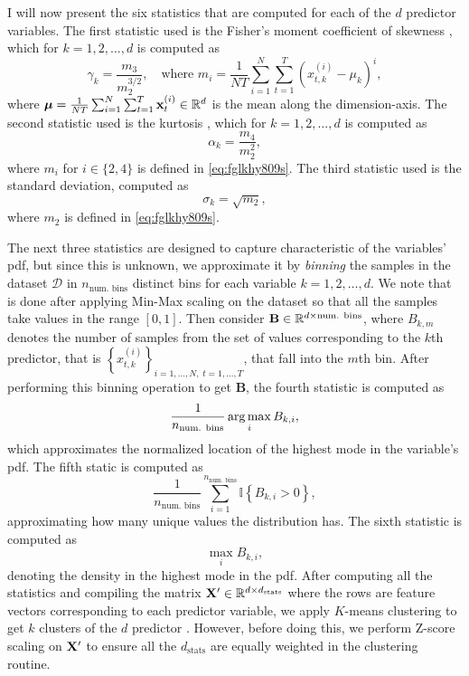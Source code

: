 \documentclass{statsmsc}
\begin{document}
{I will now present the six statistics that are computed
for each of the $d$ predictor variables.
The first statistic used is the Fisher's moment
coefficient of skewness \citep{shape}, which for $k=1,2,\dots,d$ is computed as
\begin{equation}\label{eq:fglkhy809s}
    \gamma_k=\frac{m_3}{m_2^{3/2}}, \quad \textrm{where }
    m_i=  \frac{1}{NT} \sum^{N}_{i=1} \sum^{T}_{t=1} \left(x^{(i)}_{t,k}-\mu_k \right)^i,
\end{equation}
where $\bm{\mu}=\frac{1}{NT}\sum^{N}_{i=1} \sum^{T}_{t=1} \mathbf{x}^{(i)}_t \in \mathbb{R}^d$ is the mean along the dimension-axis. 
The second statistic used is the kurtosis \citep{shape}, which for $k=1,2,\dots,d$ is computed as
\begin{equation}
    \alpha_k=\frac{m_4}{m_2^2},
\end{equation}
where $m_i$ for $i\in \{2,4\}$ is defined in  \cref{eq:fglkhy809s}.
The third statistic used is the standard deviation, computed as
\begin{equation}
    \sigma_k=\sqrt{m_2},
\end{equation}
where $m_2$ is defined in \cref{eq:fglkhy809s}.

The next three statistics are designed to capture characteristic of the variables' \ac{pdf}, but
since this is unknown, we approximate it by \textit{binning} the samples in the dataset
$\mathcal{D}$ in $n_{\textrm{num. bins}}$ distinct bins for each variable $k=1,2,\dots,d$.
We note that is done after applying Min-Max scaling on the dataset so that all the samples take
values in the range $[0,1]$.
Then consider $\mathbf{B} \in \mathbb{R}^{d \times \textrm{num. bins}}$,
where $B_{k,m}$ denotes the number of samples from the set of values corresponding to the
$k$th predictor, that is $\left\{x_{t,k}^{(i)} \right\}_{i=1,\dots,N,\;t=1,\dots,T}$,
that fall into the $m$th bin.
After performing this binning operation to get $\mathbf{B}$, the fourth statistic is computed as
\begin{equation}
    \frac{1}{n_{\textrm{num. bins} }}  \operatorname*{arg\,max}_{i} B_{k,i},
\end{equation}
which approximates the normalized location of the highest mode in the variable's \ac{pdf}.
The fifth static is computed as
\begin{equation}
    \frac{1}{n_{\textrm{num. bins} }}  \sum^{n_{\textrm{num. bins} }}_{i=1} \mathbb{I}\left\{
        B_{k,i} > 0
    \right\},
\end{equation}
approximating how many unique values the distribution has. The sixth statistic is computed as
\begin{equation}
     \max_{i} B_{k,i},
\end{equation}
denoting the density in the highest mode in the \ac{pdf}.
After computing all the statistics and compiling the matrix
$\mathbf{X}' \in \mathbb{R}^{d \times d_{\textrm{stats} }}$ where the rows are feature vectors corresponding
to each predictor variable, we apply $K$-means clustering to get $k$ clusters
of the $d$ predictor \citep{kmeans}. However, before doing this, we perform Z-score scaling
on $\mathbf{X}'$ to ensure all the $d_{\textrm{stats}}$ are equally weighted in the clustering
routine.

}
\end{document}
